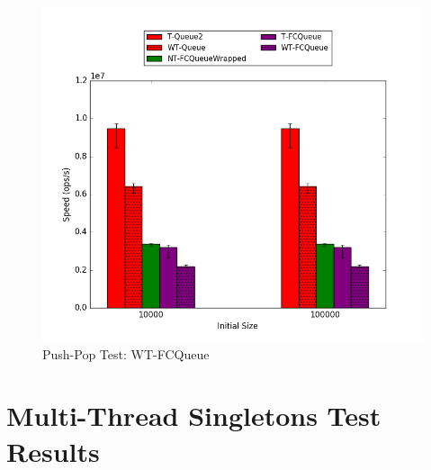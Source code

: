 \begin{figure}[H]
    \centering
	\begin{minipage}{0.45\textwidth}
    \includegraphics[width=\textwidth]{fcqueues/lpQ:PushPop.png}
	\end{minipage}
	\begin{minipage}{0.45\textwidth}
    
	\end{minipage}
    \caption{Push-Pop Test: WT-FCQueue}
    \label{fig:wtqs_pushpop}
\end{figure}

\section{Multi-Thread Singletons Test Results}
\label{app:queue_mt}

